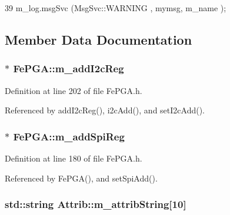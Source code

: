 \begin{DoxyCode}
39 { m_log.msgSvc (MsgSvc::WARNING , mymsg, m_name ); }
\end{DoxyCode}


\subsection{Member Data Documentation}
\hypertarget{classFePGA_af3ef3467ba803e6d3b970ea8982d6246}{
\subsubsection[{m\_\-addI2cReg}]{$\ast$ {\bf FePGA::m\_\-addI2cReg}}}
\label{classFePGA_af3ef3467ba803e6d3b970ea8982d6246}


Definition at line 202 of file FePGA.h.

Referenced by addI2cReg(), i2cAdd(), and setI2cAdd().\hypertarget{classFePGA_a569eb8410924bec1c8279ca80dc37a6a}{
\subsubsection[{m\_\-addSpiReg}]{$\ast$ {\bf FePGA::m\_\-addSpiReg}}}
\label{classFePGA_a569eb8410924bec1c8279ca80dc37a6a}


Definition at line 180 of file FePGA.h.

Referenced by FePGA(), and setSpiAdd().\hypertarget{classAttrib_a3414521d7a82476e874b25a5407b5e63}{
\subsubsection[{m\_\-attribString}]{\setlength{\rightskip}{0pt plus 5cm}std::string {\bf Attrib::m\_\-attribString}\mbox{[}10\mbox{]}}}
\label{classAttrib_a3414521d7a82476e874b25a5407b5e63}


